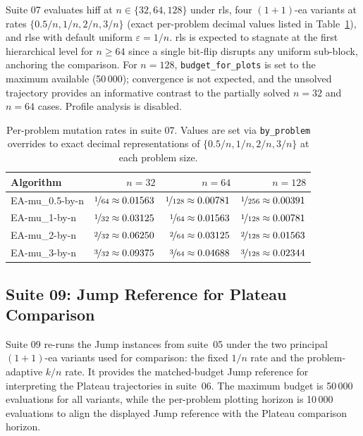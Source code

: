 
Suite 07 evaluates \acrshort{hiff} at $n \in \{32,64,128\}$ under
\acrshort{rls}, four $(1+1)$-\acrshort{ea} variants at rates
$\{0.5/n,1/n,2/n,3/n\}$ (exact per-problem decimal values listed in
Table~\ref{tab:suite07-rates}), and \acrshort{rlse} with default
uniform $\varepsilon=1/n$.
\acrshort{rls} is expected to stagnate at the first hierarchical level for
$n \geq 64$ since a single bit-flip disrupts any uniform sub-block, anchoring
the comparison. For $n=128$, \texttt{budget\_for\_plots} is set to the maximum
available (50\,000); convergence is not expected, and the unsolved trajectory
provides an informative contrast to the partially solved $n=32$ and $n=64$
cases. Profile analysis is disabled.

\begin{table}[H]
  \centering
  \small
  \begin{tabular}{@{}lrrr@{}}
    \toprule
    \textbf{Algorithm} & $n=32$ & $n=64$ & $n=128$ \\
    \midrule
    EA-mu\_0.5-by-n
    & $\nicefrac{1}{64}\approx0.01563$
    & $\nicefrac{1}{128}\approx0.00781$
    & $\nicefrac{1}{256}\approx0.00391$ \\
    EA-mu\_1-by-n
    & $\nicefrac{1}{32}\approx0.03125$
    & $\nicefrac{1}{64}\approx0.01563$
    & $\nicefrac{1}{128}\approx0.00781$ \\
    EA-mu\_2-by-n
    & $\nicefrac{2}{32}\approx0.06250$
    & $\nicefrac{2}{64}\approx0.03125$
    & $\nicefrac{2}{128}\approx0.01563$ \\
    EA-mu\_3-by-n
    & $\nicefrac{3}{32}\approx0.09375$
    & $\nicefrac{3}{64}\approx0.04688$
    & $\nicefrac{3}{128}\approx0.02344$ \\
    \bottomrule
  \end{tabular}
  \caption[Suite 07 mutation rates]{Per-problem mutation rates in
    suite 07. Values are set via
    \texttt{by\_problem} overrides to exact decimal representations of
  $\{0.5/n,1/n,2/n,3/n\}$ at each problem size.}
  \label{tab:suite07-rates}
\end{table}

\subsection{Suite 09: Jump Reference for Plateau Comparison}

Suite 09 re-runs the Jump instances from suite~05 under the two principal
$(1+1)$-\acrshort{ea} variants used for comparison: the fixed $1/n$ rate and
the problem-adaptive $k/n$ rate. It provides the matched-budget Jump reference
for interpreting the Plateau trajectories in suite~06. The maximum budget is
50\,000 evaluations for all variants, while the per-problem plotting horizon is
10\,000 evaluations to align the displayed Jump reference with the Plateau
comparison horizon.

